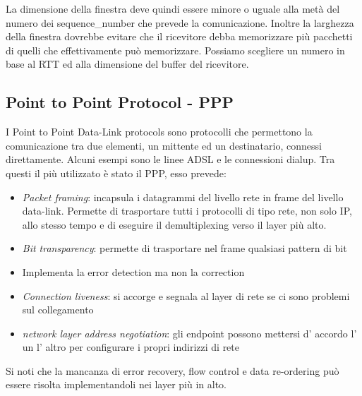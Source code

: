 La dimensione della finestra deve quindi essere minore o uguale alla metà del numero dei sequence\_number che prevede la comunicazione.
Inoltre la larghezza della finestra dovrebbe evitare che il ricevitore debba memorizzare più pacchetti di quelli che effettivamente può memorizzare.
Possiamo scegliere un numero in base al RTT ed alla dimensione del buffer del ricevitore.

\subsection{Point to Point Protocol - PPP}
I Point to Point Data-Link protocols sono protocolli che permettono la comunicazione tra due elementi, un mittente ed un destinatario, connessi direttamente.
Alcuni esempi sono le linee ADSL e le connessioni dialup.
Tra questi il più utilizzato è stato il PPP, esso prevede:
\begin{itemize}
    \item \emph{Packet framing}: incapsula i datagrammi del livello rete in frame del livello data-link.
    Permette di trasportare tutti i protocolli di tipo rete, non solo IP, allo stesso tempo e di eseguire il demultiplexing verso il layer più alto.
    
    \item \emph{Bit transparency}: permette di trasportare nel frame qualsiasi pattern di bit
    
    \item Implementa la error detection ma non la correction
    
    \item \emph{Connection liveness}: si accorge e segnala al layer di rete se ci sono problemi sul collegamento
    
    \item \emph{network layer address negotiation}: gli endpoint possono mettersi d' accordo l' un l' altro per configurare i propri indirizzi di rete
\end{itemize}

Si noti che la mancanza di error recovery, flow control e data re-ordering può essere risolta implementandoli nei layer più in alto. 

